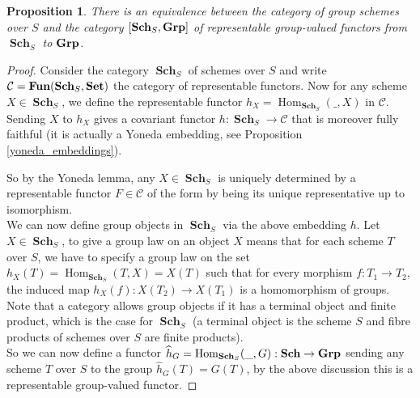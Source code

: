 \documentclass{article}
\theoremstyle{plain}
\newtheorem{proposition}[theorem]{Proposition}
\theoremstyle{definition}
\DeclareMathOperator{\Hom}{Hom}
\DeclareMathOperator{\id}{id}
\DeclareMathOperator{\Sch}{\textbf{Sch}}
\DeclareMathOperator{\SET}{\bf{Set}}
\DeclareMathOperator{\Fun}{\bf{Fun}}
\DeclareMathOperator{\Grp}{\bf{Grp}}
\begin{document}
\begin{proposition}
\label{group_scheme_are_representable_functors}
    There is an equivalence between the category of group schemes over $S$ and the category $[\Sch_S, \Grp]$ of representable group-valued functors from $\Sch_S$ to $\Grp$.
\end{proposition}
\begin{proof}

Consider the category $\Sch_S$ of schemes over $S$ and write $\mathcal{C} = \Fun(\Sch_S, \SET)$ the category of representable functors.
Now for any scheme $X\in \Sch_S$, we define the representable functor $h_X = \Hom_{\Sch_S}(\_,X)$ in $\mathcal{C}$. 
Sending $X$ to $h_X$ gives a covariant functor $h:\Sch_S \rightarrow \mathcal{C}$ that is moreover fully faithful (it is actually a Yoneda embedding, see Proposition \ref{yoneda_embeddings}).

So by the Yoneda lemma, any $X\in \Sch_S$ is uniquely determined by a representable functor $F\in \mathcal{C}$ of the form  by being its unique representative up to isomorphism.\\
We can now define group objects in $\Sch_S$ via the above embedding $h$. 
Let $X\in \Sch_S$, to give a group law on an object $X$ means that for each scheme $T$ over $S$, we have to specify a group law on the set $h_X(T) = \Hom_{\Sch_S}(T,X) = X(T)$ such that for every morphism $f:T_1\rightarrow T_2$, the induced map $h_X(f) : X(T_2) \rightarrow X(T_1)$ is a homomorphism of groups. 
Note that a category allows group objects if it has a terminal object and finite product, which is the case for $\Sch_S$ (a terminal object is the scheme $S$ and fibre products of schemes over $S$ are finite products).\\
So we can now define a functor $\widehat{h}_G = \Hom_{\Sch_S}(\_,G): \Sch \rightarrow \Grp$ sending any scheme $T$ over $S$ to the group $\widehat{h}_G(T) = G(T)$, by the above discussion this is a representable group-valued functor. 

\end{proof}
\end{document}
